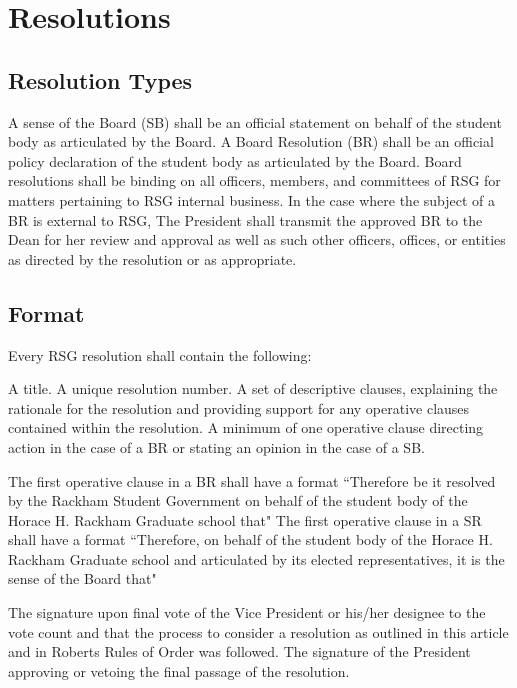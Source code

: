 \chapter{Resolutions}
\section{Resolution Types}
\begin{enumsubsection}
\itemnotoc A sense of the Board (SB) shall be an official statement on behalf of the 
student body as articulated by the Board. 
\itemnotoc A Board Resolution (BR) shall be an official policy declaration of the 
student body as articulated by the Board. Board resolutions shall be 
binding on all officers, members, and committees of RSG for matters 
pertaining to RSG internal business. In the case where the subject of a
BR is external to RSG, The President shall transmit the approved BR to the Dean for her review and approval as well as such other officers, offices, or entities as directed by the resolution or as appropriate.
\end{enumsubsection}
\section{Format}
\begin{enumsubsection}
\itemnotoc Every RSG resolution shall contain the following:
\begin{enumsubsubsection}
\itemnotoc A title.
\itemnotoc A unique resolution number.
\itemnotoc A set of descriptive clauses, explaining the rationale for the 
resolution and providing support for any operative clauses 
contained within the resolution. 
\itemnotoc A minimum of one operative clause directing action in the case of 
a BR or stating an opinion in the case of a SB. 
\begin{enumerate}
\itemnotoc The first operative clause in a BR shall have a format 
``Therefore be it resolved by the Rackham Student 
Government on behalf of the student body of the Horace H. 
Rackham Graduate school that"
\itemnotoc The first operative clause in a SR shall have a format 
``Therefore, on behalf of the student body of the Horace H. 
Rackham Graduate school and articulated by its elected 
representatives, it is the sense of the Board that"
\end{enumerate}
\itemnotoc The signature upon final vote of the Vice President or his/her 
designee to the vote count and that the process to consider a 
resolution as outlined in this article and in Roberts Rules of Order 
was followed. 
\itemnotoc The signature of the President approving or vetoing the final 
passage of the resolution.
\end{enumsubsubsection}
\end{enumsubsection}
